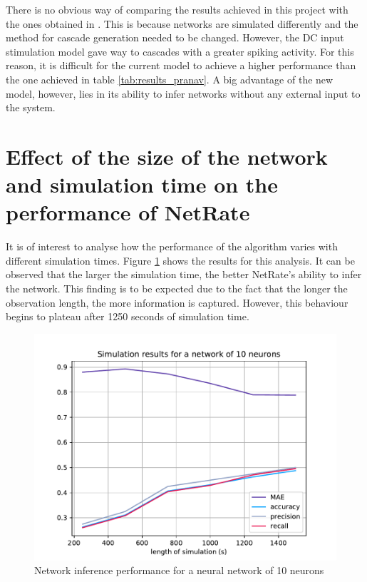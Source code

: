 There is no obvious way of comparing the results achieved in this project with the ones obtained in \cite{alexandru2018estimating}. This is because networks are simulated differently and the method for cascade generation needed to be changed. However, the DC input stimulation model gave way to cascades with a greater spiking activity. For this reason, it is difficult for the current model to achieve a higher performance than the one achieved in table \ref{tab:results_pranav}. A big advantage of the new model, however, lies in its ability to infer networks without any external input to the system.

\section{Effect of the size of the network and simulation time on the performance of NetRate}

It is of interest to analyse how the performance of the algorithm varies with different simulation times. Figure \ref{fig:results_10_neurons} shows the results for this analysis. It can be observed that the larger the simulation time, the better NetRate's ability to infer the network. This finding is to be expected due to the fact that the longer the observation length, the more information is captured. However, this behaviour begins to plateau after 1250 seconds of simulation time.\\

\begin{figure}
	\centering
	\includegraphics[width=0.8\linewidth]{results_10_neurons.pdf}
	\caption{Network inference performance for a neural network of 10 neurons}
	\label{fig:results_10_neurons}
\end{figure}

